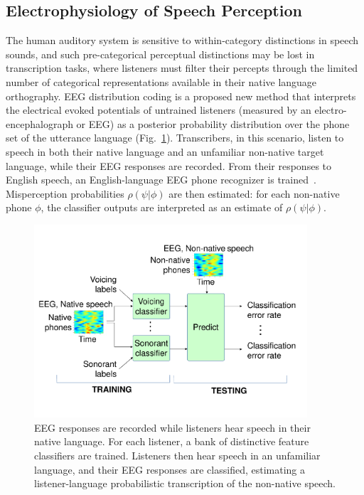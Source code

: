 \subsection{Electrophysiology of Speech Perception}

The human auditory system is sensitive to within-category distinctions
in speech sounds, and such pre-categorical perceptual distinctions may
be lost in transcription tasks, where listeners must filter their
percepts through the limited number of categorical representations
available in their native language orthography.  EEG distribution
coding is a proposed new method that interprets the electrical evoked
potentials of untrained listeners (measured by an
electro-encephalograph or EEG) as a posterior probability distribution
over the phone set of the utterance language
(Fig.~\ref{fig:eeg_paradigm}).  Transcribers, in this scenario, listen
to speech in both their native language and an unfamiliar non-native
target language, while their EEG responses are recorded.  From their
responses to English speech, an English-language EEG phone recognizer
is trained~\cite{Liberto15}.  Misperception probabilities
$\rho(\psi|\phi)$ are then estimated: for each non-native phone
$\phi$, the classifier outputs are interpreted as an estimate of
$\rho(\psi|\phi)$.

\begin{figure}
  \centerline{\includegraphics[width=4in]{../figs/Slide2JSALT.pdf}}
  \caption{EEG responses are recorded while listeners hear speech in
    their native language.  For each listener, a bank of distinctive
    feature classifiers are trained.  Listeners then hear speech in an
    unfamiliar language, and their EEG responses are classified,
    estimating a listener-language probabilistic transcription of the
    non-native speech.}
  \label{fig:eeg_paradigm}
\end{figure}

